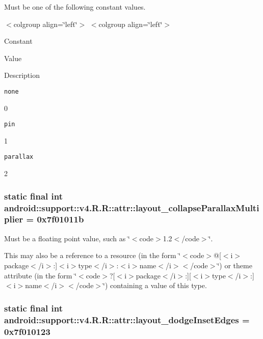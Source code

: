 Must be one of the following constant values. \begin{TabularC}{0}
\hline
\end{TabularC}
$<$colgroup align=\char`\"{}left\char`\"{}$>$ $<$colgroup align=\char`\"{}left\char`\"{}$>$ 

Constant

Value

Description 

{\tt none}

0

{\tt pin}

1

{\tt parallax}

2\hypertarget{classandroid_1_1support_1_1v4_1_1_r_1_1attr_25f8f69dee033158e6eb7aef783577a5}{
\subsubsection[{layout\_\-collapseParallaxMultiplier}]{\setlength{\rightskip}{0pt plus 5cm}static final int android::support::v4.R.R::attr::layout\_\-collapseParallaxMultiplier = 0x7f01011b}}
\label{classandroid_1_1support_1_1v4_1_1_r_1_1attr_25f8f69dee033158e6eb7aef783577a5}


Must be a floating point value, such as \char`\"{}$<$code$>$1.2$<$/code$>$\char`\"{}. 

This may also be a reference to a resource (in the form \char`\"{}$<$code$>$@\mbox{[}$<$i$>$package$<$/i$>$:\mbox{]}$<$i$>$type$<$/i$>$:$<$i$>$name$<$/i$>$$<$/code$>$\char`\"{}) or theme attribute (in the form \char`\"{}$<$code$>$?\mbox{[}$<$i$>$package$<$/i$>$:\mbox{]}\mbox{[}$<$i$>$type$<$/i$>$:\mbox{]}$<$i$>$name$<$/i$>$$<$/code$>$\char`\"{}) containing a value of this type. \hypertarget{classandroid_1_1support_1_1v4_1_1_r_1_1attr_3ef512fff627f839d4147629442721f0}{
\subsubsection[{layout\_\-dodgeInsetEdges}]{\setlength{\rightskip}{0pt plus 5cm}static final int android::support::v4.R.R::attr::layout\_\-dodgeInsetEdges = 0x7f010123}}
\label{classandroid_1_1support_1_1v4_1_1_r_1_1attr_3ef512fff627f839d4147629442721f0}


